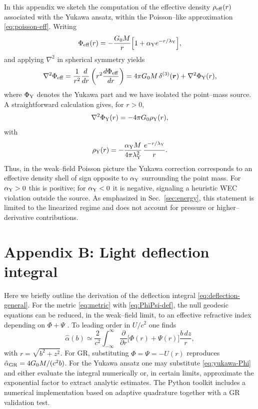 \documentclass[11pt,a4paper]{article}
\begin{document}
In this appendix we sketch the computation of the effective density $\rho_{\rm eff}(r)$ associated with the Yukawa ansatz, within the Poisson--like approximation \eqref{eq:poisson-eff}. Writing
\begin{equation}
\Phi_{\rm eff}(r) = -\frac{G_0M}{r}\Bigl[1 + \alpha_{\rm Y} e^{-r/\lambda_{\rm Y}}\Bigr],
\end{equation}
and applying $\nabla^2$ in spherical symmetry yields
\begin{equation}
\nabla^2 \Phi_{\rm eff} = \frac{1}{r^2}\frac{d}{dr}\left(r^2\frac{d\Phi_{\rm eff}}{dr}\right)
= 4\pi G_0 M\,\delta^{(3)}(\bm{r}) + \nabla^2 \Phi_{\rm Y}(r),
\end{equation}
where $\Phi_{\rm Y}$ denotes the Yukawa part and we have isolated the point--mass source. A straightforward calculation gives, for $r>0$,
\begin{equation}
\nabla^2 \Phi_{\rm Y}(r) = -4\pi G_0 \rho_{\rm Y}(r),
\end{equation}
with
\begin{equation}
\rho_{\rm Y}(r) = -\frac{\alpha_{\rm Y} M}{4\pi \lambda_{\rm Y}^2}\,
\frac{e^{-r/\lambda_{\rm Y}}}{r}.
\end{equation}
Thus, in the weak--field Poisson picture the Yukawa correction corresponds to an effective density shell of sign opposite to $\alpha_{\rm Y}$ surrounding the point mass. For $\alpha_{\rm Y}>0$ this is positive; for $\alpha_{\rm Y}<0$ it is negative, signaling a heuristic WEC violation outside the source. As emphasized in Sec.~\ref{sec:energy}, this statement is limited to the linearized regime and does not account for pressure or higher--derivative contributions.

\section*{Appendix B: Light deflection integral}

Here we briefly outline the derivation of the deflection integral \eqref{eq:deflection-general}. For the metric \eqref{eq:metric} with \eqref{eq:PhiPsi-def}, the null geodesic equations can be reduced, in the weak--field limit, to an effective refractive index depending on $\Phi+\Psi$ \cite{Will2014}. To leading order in $U/c^2$ one finds
\begin{equation}
\hat{\alpha}(b) \simeq \frac{2}{c^2} \int_{-\infty}^{\infty} \frac{\partial}{\partial r}\bigl[\Phi(r)+\Psi(r)\bigr]\frac{b\,dz}{r},
\end{equation}
with $r=\sqrt{b^2+z^2}$. For GR, substituting $\Phi=\Psi=-U(r)$ reproduces $\hat{\alpha}_{\rm GR}=4G_0M/(c^2 b)$. For the Yukawa ansatz one may substitute \eqref{eq:yukawa-Phi} and either evaluate the integral numerically or, in certain limits, approximate the exponential factor to extract analytic estimates. The Python toolkit includes a numerical implementation based on adaptive quadrature together with a GR validation test.
\end{document}
